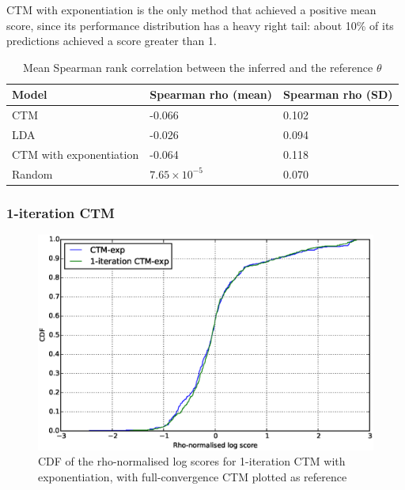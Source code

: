 \documentclass[12pt,a4paper,twoside,openright]{report}
\begin{document}
CTM with exponentiation is the only method that achieved a positive mean score, since its performance distribution has a heavy right tail: about 10\% of its predictions achieved a score greater than 1.

\begin{table}
\begin{tabular}{| l | l | l |}
\hline
Model & Spearman rho (mean) & Spearman rho (SD) \\
\hline
CTM & -0.066 & 0.102\\
LDA & -0.026 & 0.094\\
CTM with exponentiation & -0.064 & 0.118 \\
Random & $7.65 \times 10^{-5}$ & 0.070 \\
\hline
\end{tabular}
\caption{Mean Spearman rank correlation between the inferred and the reference $\theta$}
\label{tab:ctd-spearman}
\end{table}

\subsubsection{1-iteration CTM}

\begin{figure}[!htb]
\includegraphics[width=\textwidth]{ctd-ctm-1iter-rho.eps}
\caption{CDF of the rho-normalised log scores for 1-iteration CTM with exponentiation, with full-convergence CTM plotted as reference}
\label{fig:ctd-ctm-1iter-rho}
\end{figure}
\end{document}
